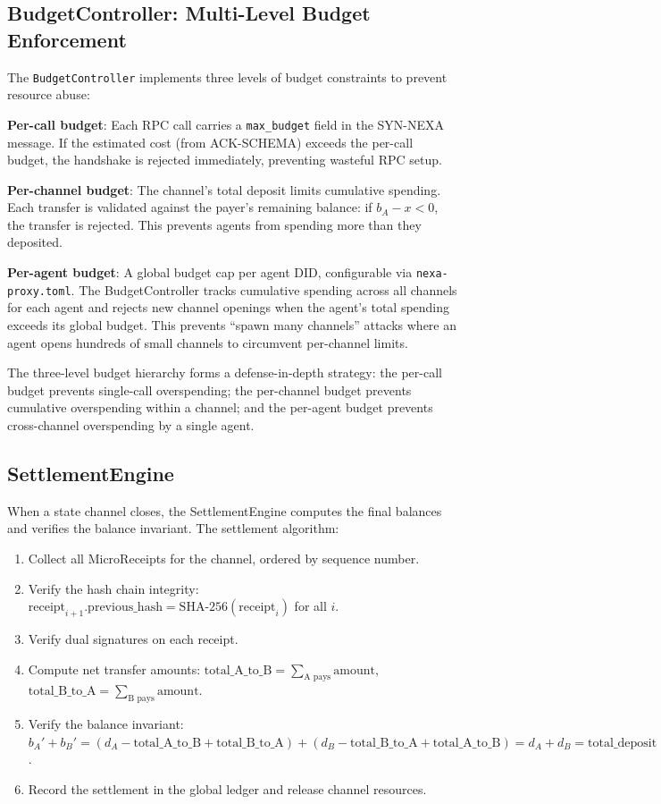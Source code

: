 \subsection{BudgetController: Multi-Level Budget Enforcement}

The \texttt{BudgetController} implements three levels of budget constraints to prevent resource abuse:

\textbf{Per-call budget}: Each RPC call carries a \texttt{max\_budget} field in the SYN-NEXA message. If the estimated cost (from ACK-SCHEMA) exceeds the per-call budget, the handshake is rejected immediately, preventing wasteful RPC setup.

\textbf{Per-channel budget}: The channel's total deposit limits cumulative spending. Each transfer is validated against the payer's remaining balance: if $b_A - x < 0$, the transfer is rejected. This prevents agents from spending more than they deposited.

\textbf{Per-agent budget}: A global budget cap per agent DID, configurable via \texttt{nexa-proxy.toml}. The BudgetController tracks cumulative spending across all channels for each agent and rejects new channel openings when the agent's total spending exceeds its global budget. This prevents ``spawn many channels'' attacks where an agent opens hundreds of small channels to circumvent per-channel limits.

The three-level budget hierarchy forms a defense-in-depth strategy: the per-call budget prevents single-call overspending; the per-channel budget prevents cumulative overspending within a channel; and the per-agent budget prevents cross-channel overspending by a single agent.

\subsection{SettlementEngine}

When a state channel closes, the SettlementEngine computes the final balances and verifies the balance invariant. The settlement algorithm:

\begin{enumerate}
  \item Collect all MicroReceipts for the channel, ordered by sequence number.
  \item Verify the hash chain integrity: $\text{receipt}_{i+1}.\text{previous\_hash} = \text{SHA-256}(\text{receipt}_i)$ for all $i$.
  \item Verify dual signatures on each receipt.
  \item Compute net transfer amounts: $\text{total\_A\_to\_B} = \sum_{\text{A pays}} \text{amount}$, $\text{total\_B\_to\_A} = \sum_{\text{B pays}} \text{amount}$.
  \item Verify the balance invariant: $b_A' + b_B' = (d_A - \text{total\_A\_to\_B} + \text{total\_B\_to\_A}) + (d_B - \text{total\_B\_to\_A} + \text{total\_A\_to\_B}) = d_A + d_B = \text{total\_deposit}$.
  \item Record the settlement in the global ledger and release channel resources.
\end{enumerate}

